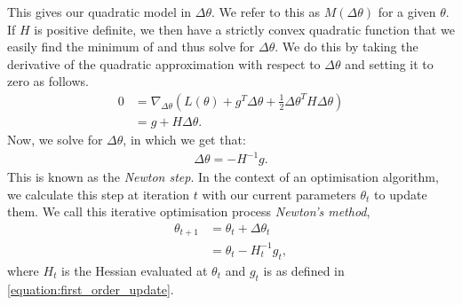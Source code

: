 This gives our quadratic model in $\Delta \theta$. We refer to this as $M(\Delta \theta)$ for a given $\theta$. If $H$ is positive definite, we then have a strictly convex quadratic function that we easily find the minimum of and thus solve for $\Delta \theta$. We do this by taking the derivative of the quadratic approximation with respect to $\Delta \theta$ and setting it to zero as follows.
\begin{align}
    0 &= \nabla_{\Delta \theta} \left( L(\theta) + g^T \Delta \theta + \frac{1}{2} \Delta \theta^T H \Delta \theta \right) \\
    &= g + H \Delta \theta.
\end{align}
Now, we solve for $\Delta \theta$, in which we get that:
\begin{align}
    \Delta \theta = - H^{-1} g.
\end{align} 
This is known as the \textit{Newton step}. In the context of an optimisation algorithm, we calculate this step at iteration $t$ with our current parameters $\theta_t$ to update them. We call this iterative optimisation process \textit{Newton's method},
\begin{align}
    \theta_{t+1} &= \theta_t + \Delta \theta_t \\
    &= \theta_t - H_t^{-1} g_t,
\end{align}
where $H_t$ is the Hessian evaluated at $\theta_t$ and $g_t$ is as defined in \cref{equation:first_order_update}.

